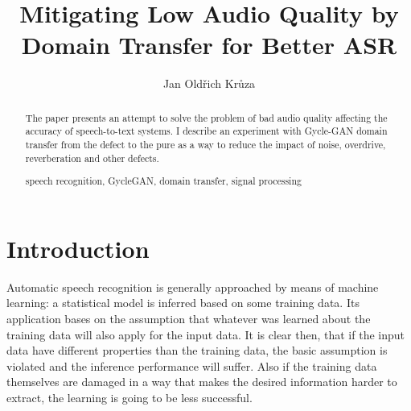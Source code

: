 \documentclass[runningheads,a4paper]{llncs}
\newcommand{\keywords}[1]{\par\addvspace\baselineskip
\noindent\keywordname\enspace\ignorespaces#1}
\begin{document}
\mainmatter  %

\title{Mitigating Low Audio Quality by Domain Transfer for Better ASR}


%
%
\author{Jan Oldřich Krůza}
%


%
%

\maketitle


\begin{abstract}
The paper presents an attempt to solve the problem of bad audio quality
affecting the accuracy of speech-to-text systems. I
describe an experiment with Gycle-GAN domain transfer from the defect to the
pure as a way to reduce the impact of noise, overdrive, reverberation and other
defects.
\keywords{speech recognition, GycleGAN, domain transfer, signal processing}
\end{abstract}

\section{Introduction}

Automatic speech recognition is generally approached by means of machine
learning: a statistical model is inferred based on some training data. Its
application bases on the assumption that whatever was learned about the training
data will also apply for the input data. It is clear then, that if the input
data have different properties than the training data, the basic assumption is
violated and the inference performance will suffer.
Also if the training data themselves are damaged in a way that makes the desired
information harder to extract, the learning is going to be less successful.
\end{document}
